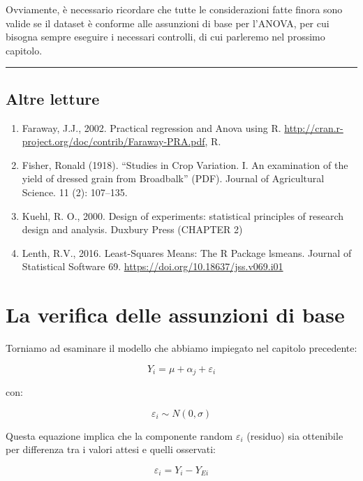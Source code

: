\documentclass[a4paper,12pt,oneside]{book}
\providecommand{\tightlist}{%
  \setlength{\itemsep}{0pt}\setlength{\parskip}{0pt}}
\begin{document}
Ovviamente, è necessario ricordare che tutte le considerazioni fatte finora sono valide se il dataset è conforme alle assunzioni di base per l'ANOVA, per cui bisogna sempre eseguire i necessari controlli, di cui parleremo nel prossimo capitolo.

\begin{center}\rule{0.5\linewidth}{0.5pt}\end{center}

\hypertarget{altre-letture-6}{%
\section{Altre letture}\label{altre-letture-6}}

\begin{enumerate}
\def\labelenumi{\arabic{enumi}.}
\tightlist
\item
  Faraway, J.J., 2002. Practical regression and Anova using R. \url{http://cran.r-project.org/doc/contrib/Faraway-PRA.pdf}, R.
\item
  Fisher, Ronald (1918). ``Studies in Crop Variation. I. An examination of the yield of dressed grain from Broadbalk'' (PDF). Journal of Agricultural Science. 11 (2): 107--135.
\item
  Kuehl, R. O., 2000. Design of experiments: statistical principles of research design and analysis. Duxbury Press (CHAPTER 2)
\item
  Lenth, R.V., 2016. Least-Squares Means: The R Package lsmeans. Journal of Statistical Software 69. \url{https://doi.org/10.18637/jss.v069.i01}
\end{enumerate}

\hypertarget{la-verifica-delle-assunzioni-di-base}{%
\chapter{La verifica delle assunzioni di base}\label{la-verifica-delle-assunzioni-di-base}}

Torniamo ad esaminare il modello che abbiamo impiegato nel capitolo precedente:

\[Y_i = \mu + \alpha_j + \varepsilon_i\]

con:

\[ \varepsilon_i \sim N(0, \sigma) \]

Questa equazione implica che la componente random \(\varepsilon_i\) (residuo) sia ottenibile per differenza tra i valori attesi e quelli osservati:

\[\varepsilon_i = Y_i - Y_{Ei}\]
\end{document}
